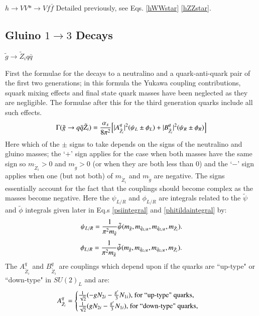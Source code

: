 \documentclass[final,3p,times]{elsarticle}
\begin{document}
\textbf{\underline{$h \rightarrow VV* \rightarrow V f \bar{f}$}}
Detailed previously, see Eqs. \eqref{hWWstar} \eqref{hZZstar}.

\subsection{Gluino $1 \rightarrow 3$ Decays}

\underline{$\tilde{g} \rightarrow \tilde{Z}_i q \bar{q}$}

First the formulae for the decays to a neutralino and a quark-anti-quark pair of the first two generations; in this formula the Yukawa coupling contributions, squark mixing effects and final state quark masses have been neglected as they are negligible. The formulae after this for the third generation quarks include all such effects.
\begin{equation} \label{gqqneut}
\Gamma(\tilde{g} \rightarrow q \bar{q} \tilde{Z}_i) = {\alpha_s \over 8 \pi^2 }\Big[|A_{{\tilde{Z}_i}}^{q}|^2 (\psi_{L} \pm \phi_{L}) + |B_{{\tilde{Z}_i}}^{q}|^2 (\psi_{R} \pm \phi_{R})\Big]
\end{equation}
Here which of the $\pm$ signs to take depends on the signs of the neutralino and gluino masses; the `$+$' sign applies for the case when both masses have the same sign so $m_{\tilde{Z}_i} > 0$ and $m_{\tilde{g}} > 0$ (or when they are both less than 0) and the `$-$' sign applies when one (but not both) of $m_{\tilde{Z}_i}$ and $m_{\tilde{g}}$ are negative. The signs essentially account for the fact that the couplings should become complex as the masses become negative.
Here the $\psi_{L/R}$ and $\phi_{L/R}$ are integrals related to the $\tilde{\psi}$ and $\tilde{\phi}$ integrals given later in Eq.s \eqref{psiintegral} and \eqref{phitildaintegral} by:
\begin{equation}
\psi_{L/R} = {1 \over \pi^2 m_{\tilde{g}}} \tilde{\psi}(m_{\tilde{g}},m_{\tilde{q}_{L/R}},m_{\tilde{q}_{L/R}},m_{\tilde{Z}_i}).
\end{equation}
\begin{equation}
\phi_{L/R} = {1 \over \pi^2 m_{\tilde{g}}} \tilde{\psi}(m_{\tilde{g}},m_{\tilde{q}_{L/R}},m_{\tilde{q}_{L/R}},m_{\tilde{Z}_i}).
\end{equation}
The $A_{{\tilde{Z}_i}}^{q}$ and $B_{{\tilde{Z}_i}}^{q}$ are couplings which depend upon if the quarks are ``up-type" or ``down-type" in $SU(2)_L$ and are:
\begin{equation}
A_{{\tilde{Z}_i}}^{q} = \begin{cases} 
						{1 \over \sqrt{2}} (-gN_{2i} - {g' \over 3}N_{1i})$, for ``up-type" quarks,$ \\
						{1 \over \sqrt{2}} (gN_{2i} - {g' \over 3}N_{1i})$, for ``down-type" quarks,$
						\end{cases}
\end{equation}
\end{document}
